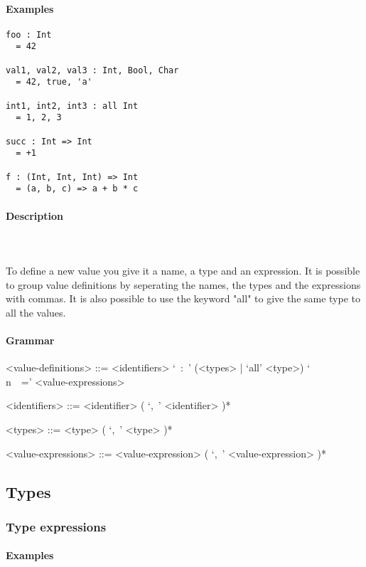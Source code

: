 \documentclass{article}
\def\pend{\mbox{} \\\\}
\begin{document}
\paragraph{Examples}

\begin{verbatim}
foo : Int
  = 42

val1, val2, val3 : Int, Bool, Char
  = 42, true, 'a'

int1, int2, int3 : all Int
  = 1, 2, 3

succ : Int => Int
  = +1

f : (Int, Int, Int) => Int
  = (a, b, c) => a + b * c
\end{verbatim}

\paragraph{Description}\pend
To define a new value you give it a name, a type and an expression. It is possible
to group value definitions by seperating the names, the types and the expressions
with commas. It is also possible to use the keyword "all" to give the same type
to all the values.

\paragraph{Grammar}
\begin{grammar}
<value-definitions> ::=
<identifiers> `\ :\ ' (<types> | `all' <type>) `\\n\ \ =' <value-expressions>

<identifiers> ::= <identifier> ( `,\ ' <identifier> )*  

<types> ::= <type> ( `,\ ' <type> )*  

<value-expressions> ::= <value-expression> ( `,\ ' <value-expression> )*  
\end{grammar}


\subsection{Types}

\subsubsection{Type expressions}

\paragraph{Examples}
\end{document}
